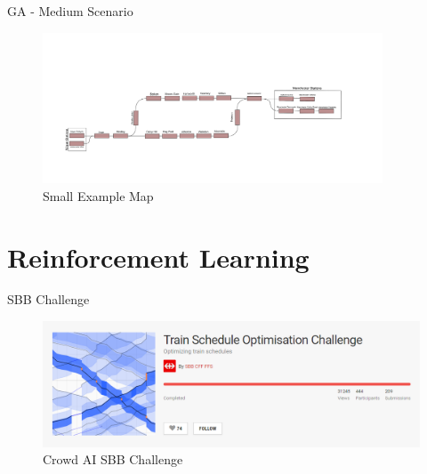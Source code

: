 \documentclass[aspectratio=169]{beamer}
\begin{document}
\begin{frame}{GA - Medium Scenario}
    \begin{figure}
        \centering
        \includegraphics[width=0.9\textwidth]{assets/GA/SmallNetwork.png}
        \caption{Small Example Map}
        \label{fig:ga-small}
    \end{figure}
\end{frame}

\section{Reinforcement Learning}
\begin{frame}{SBB Challenge}
    \begin{figure}
        \centering
        \includegraphics[width=\textwidth]{assets/RL/SBB.PNG}
        \caption{Crowd AI SBB Challenge}
        \label{fig:sbb}
    \end{figure}
\end{frame}
\end{document}
